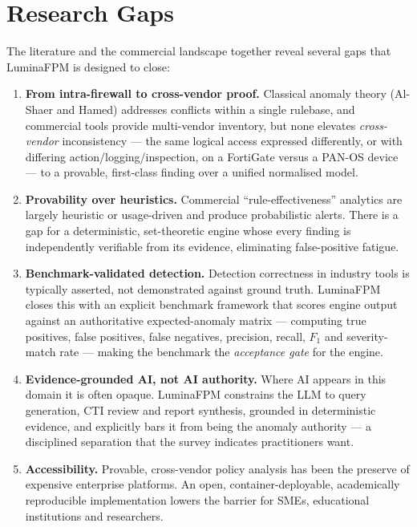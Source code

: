 \documentclass[12pt,a4paper]{report}
\renewcommand{\_}{\textunderscore\allowbreak}
\begin{document}
\section{Research Gaps}
\label{sec:ch2-gaps}
The literature and the commercial landscape together reveal several gaps that LuminaFPM is designed to close:

\begin{enumerate}[leftmargin=2em]
  \item \textbf{From intra-firewall to cross-vendor proof.} Classical anomaly theory (Al-Shaer and Hamed) addresses conflicts within a single rulebase, and commercial tools provide multi-vendor inventory, but none elevates \emph{cross-vendor} inconsistency --- the same logical access expressed differently, or with differing action/logging/inspection, on a FortiGate versus a PAN-OS device --- to a provable, first-class finding over a unified normalised model.
  \item \textbf{Provability over heuristics.} Commercial ``rule-effectiveness'' analytics are largely heuristic or usage-driven and produce probabilistic alerts. There is a gap for a deterministic, set-theoretic engine whose every finding is independently verifiable from its evidence, eliminating false-positive fatigue.
  \item \textbf{Benchmark-validated detection.} Detection correctness in industry tools is typically asserted, not demonstrated against ground truth. LuminaFPM closes this with an explicit benchmark framework that scores engine output against an authoritative expected-anomaly matrix --- computing true positives, false positives, false negatives, precision, recall, $F_1$ and severity-match rate --- making the benchmark the \emph{acceptance gate} for the engine.
  \item \textbf{Evidence-grounded AI, not AI authority.} Where AI appears in this domain it is often opaque. LuminaFPM constrains the LLM to query generation, CTI review and report synthesis, grounded in deterministic evidence, and explicitly bars it from being the anomaly authority --- a disciplined separation that the survey indicates practitioners want.
  \item \textbf{Accessibility.} Provable, cross-vendor policy analysis has been the preserve of expensive enterprise platforms. An open, container-deployable, academically reproducible implementation lowers the barrier for SMEs, educational institutions and researchers.
\end{enumerate}
\end{document}
